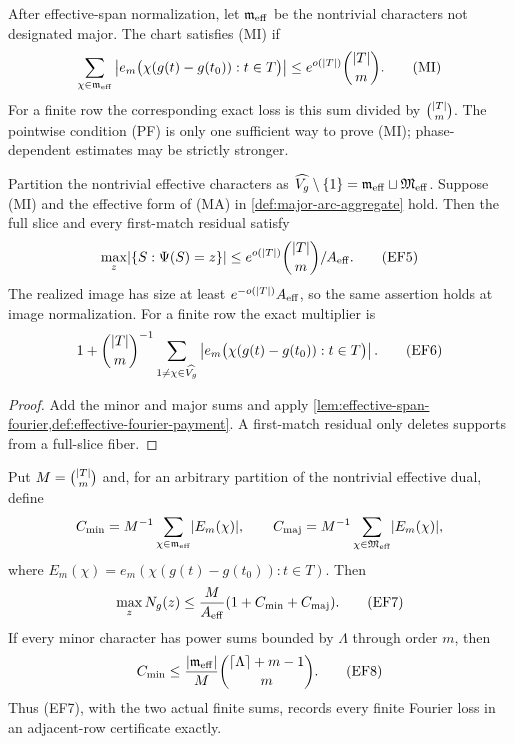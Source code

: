 \documentclass[11pt,a4paper]{amsart}
\numberwithin{equation}{section}
\theoremstyle{remark}
\newcommand{\ceil}[1]{\left\lceil #1\right\rceil}\newcommand{\defeq}{\coloneqq}
\begin{document}
\begin{definition}
\label{def:aggregate-minor-payment}
After effective-span normalization, let \(\mathfrak m_{\rm eff}\) be the
nontrivial characters not designated major.  The chart satisfies
\textup{(MI)} if
\[
 \sum_{\chi\in\mathfrak m_{\rm eff}}
 \left|e_m\bigl(\chi(g(t)-g(t_0)):t\in T\bigr)\right|
 \le e^{o(\lvert T\rvert)}\binom{\lvert T\rvert}m.                 \tag{MI}
\]
For a finite row the corresponding exact loss is this sum divided by
\(\binom{\lvert T\rvert}m\).  The pointwise condition \textup{(PF)} is only one
sufficient way to prove \textup{(MI)}; phase-dependent estimates may be
strictly stronger.
\end{definition}

\begin{proposition}
\label{prop:effective-mi-ma-flatness}
Partition the nontrivial effective characters as
\(\widehat{V_g}\setminus\{1\}
=\mathfrak m_{\rm eff}\sqcup\mathfrak M_{\rm eff}\).  Suppose
\textup{(MI)} and the effective form of \textup{(MA)} in
\cref{def:major-arc-aggregate} hold.
Then the full slice and every first-match residual satisfy
\[
 \max_z\lvert \{S:\Psi(S)=z\}\rvert
 \le e^{o(\lvert T\rvert)}\binom{\lvert T\rvert}m/A_{\rm eff}.     \tag{EF5}
\]
The realized image has size at least
\(e^{-o(\lvert T\rvert)}A_{\rm eff}\), so the same assertion holds at image
normalization.  For a finite row the exact multiplier is
\[
 1+\binom{\lvert T\rvert}m^{-1}
 \sum_{1\ne\chi\in\widehat{V_g}}
 \left|e_m\bigl(\chi(g(t)-g(t_0)):t\in T\bigr)\right|.
 \tag{EF6}
\]
\end{proposition}

\begin{proof}
Add the minor and major sums and apply
\cref{lem:effective-span-fourier,def:effective-fourier-payment}.  A
first-match residual only deletes supports from a full-slice fiber.
\end{proof}

\begin{corollary}
\label{cor:exact-finite-fourier-constants}
Put \(M=\binom{\lvert T\rvert}m\) and, for an arbitrary partition of the
nontrivial effective dual, define
\[
 C_{\rm min}=M^{-1}\sum_{\chi\in\mathfrak m_{\rm eff}}\lvert E_m(\chi)\rvert,
 \qquad
 C_{\rm maj}=M^{-1}\sum_{\chi\in\mathfrak M_{\rm eff}}\lvert E_m(\chi)\rvert,
\]
where
\(E_m(\chi)=e_m(\chi(g(t)-g(t_0)):t\in T)\).  Then
\[
              \max_zN_g(z)\le
              \frac{M}{A_{\rm eff}}
              (1+C_{\rm min}+C_{\rm maj}).          \tag{EF7}
\]
If every minor character has power sums bounded by \(\Lambda\) through
order \(m\), then
\[
 C_{\rm min}\le
 \frac{\abs{\mathfrak m_{\rm eff}}}{M}
 \binom{\ceil\Lambda+m-1}{m}.                      \tag{EF8}
\]
Thus \textup{(EF7)}, with the two actual finite sums, records every finite
Fourier loss in an adjacent-row certificate exactly.
\end{corollary}
\end{document}
